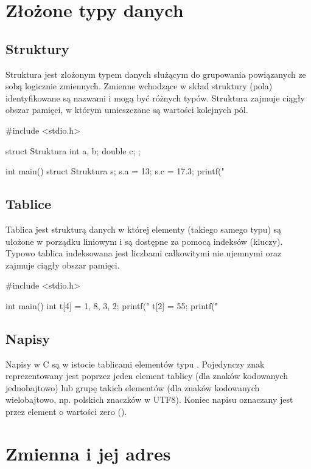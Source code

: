 \documentclass{pdfBooklets}
\begin{document}
\section{Złożone typy danych}

\subsection{Struktury}
Struktura jest złożonym typem danych służącym do grupowania powiązanych ze sobą logicznie zmiennych. Zmienne wchodzące w skład struktury (pola) identyfikowane są nazwami i mogą być różnych typów. Struktura zajmuje ciągły obszar pamięci, w którym umieszczane są wartości kolejnych pól. 

\begin{CodeFrame*}[c]{}
#include <stdio.h>

struct Struktura {
  int a, b;
  double c;
};

int main() {
  struct Struktura s;
  s.a = 13;
  s.c = 17.3;
  printf("%
}
\end{CodeFrame*}

\subsection{Tablice}
Tablica jest strukturą danych w której elementy (takiego samego typu) są ułożone w porządku liniowym i są dostępne za pomocą indeksów (kluczy). Typowo tablica indeksowana jest liczbami całkowitymi nie ujemnymi oraz zajmuje ciągły obszar pamięci.

\begin{CodeFrame*}[c]{}
#include <stdio.h>

int main() {
  int t[4] = {1, 8, 3, 2};
  printf("%
  t[2] = 55;
  printf("  %
}
\end{CodeFrame*}

\subsection{Napisy}
Napisy w C są w istocie tablicami elementów typu . Pojedynczy znak reprezentowany jest poprzez jeden element tablicy (dla znaków kodowanych jednobajtowo) lub grupę takich elementów (dla znaków kodowanych wielobajtowo, np. polskich znaczków w UTF8). Koniec napisu oznaczany jest przez element o wartości zero ().

\section{Zmienna i jej adres}
\end{document}
